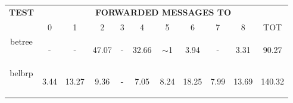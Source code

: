 \documentclass{article}
\begin{document}
		\begin{table}[H]
			\begin{center}
			    \begin{tabular}{|c|c|c|c|c|c|c|c|c|c|c|}
				    \hline
				    \multirow{2}{*}{\textbf{TEST}} & \multicolumn{10}{c|}{\textbf{FORWARDED MESSAGES TO}} \\ \cline{2-11}
					& 0 & 1 & 2 & 3 & 4 & 5& 6 & 7 & 8 & TOT \\ \hline
				    betree & \begin{footnotesize}-\end{footnotesize} & \begin{footnotesize}-\end{footnotesize} & \begin{footnotesize}47.07\end{footnotesize} & \begin{footnotesize}-\end{footnotesize} & \begin{footnotesize}32.66\end{footnotesize} & \begin{footnotesize}$\sim$1\end{footnotesize} & \begin{footnotesize}3.94\end{footnotesize} & \begin{footnotesize}-\end{footnotesize} & \begin{footnotesize}3.31\end{footnotesize} & \begin{footnotesize}90.27\end{footnotesize} \\ \hline
				    belbrp & \begin{footnotesize}3.44\end{footnotesize} & \begin{footnotesize}13.27\end{footnotesize} & \begin{footnotesize}9.36\end{footnotesize} & \begin{footnotesize}-\end{footnotesize} & \begin{footnotesize}7.05\end{footnotesize} & \begin{footnotesize}8.24\end{footnotesize} & \begin{footnotesize}18.25\end{footnotesize} & \begin{footnotesize}7.99\end{footnotesize} & \begin{footnotesize}13.69\end{footnotesize} & \begin{footnotesize}140.32\end{footnotesize}\\ \hline

\end{tabular}
\end{center}
\end{table}
\end{document}
